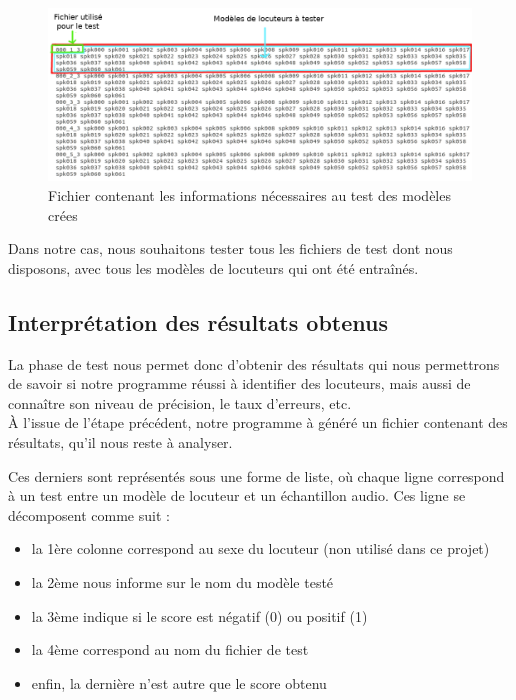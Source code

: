 \documentclass[a4paper, 12pt]{book}
\newcounter{program}[subsection]
\begin{document}
\begin{figure}[htbp]
  \centering
  \includegraphics[width=1\linewidth]{images/testFile.png}
  \caption{Fichier contenant les informations nécessaires au test des modèles crées}
\end{figure}

Dans notre cas, nous souhaitons tester tous les fichiers de test dont nous disposons, avec tous les modèles de locuteurs qui ont été entraînés.

\subsection{Interprétation des résultats obtenus}

La phase de test nous permet donc d'obtenir des résultats qui nous permettrons de savoir si notre programme réussi à identifier des locuteurs, mais aussi de connaître son niveau de précision, le taux d'erreurs, etc.\\

À l'issue de l'étape précédent, notre programme à généré un fichier contenant des résultats, qu'il nous reste à analyser. 

Ces derniers sont représentés sous une forme de liste, où chaque ligne correspond à un test entre un modèle de locuteur et un échantillon audio. Ces ligne se décomposent comme suit :

\begin{itemize}
  \item la 1ère colonne correspond au sexe du locuteur (non utilisé dans ce projet) 
  \item la 2ème nous informe sur le nom du modèle testé
  \item la 3ème indique si le score est négatif (0) ou positif (1)
  \item la 4ème correspond au nom du fichier de test
  \item enfin, la dernière n'est autre que le score obtenu
\end{itemize}
\end{document}
